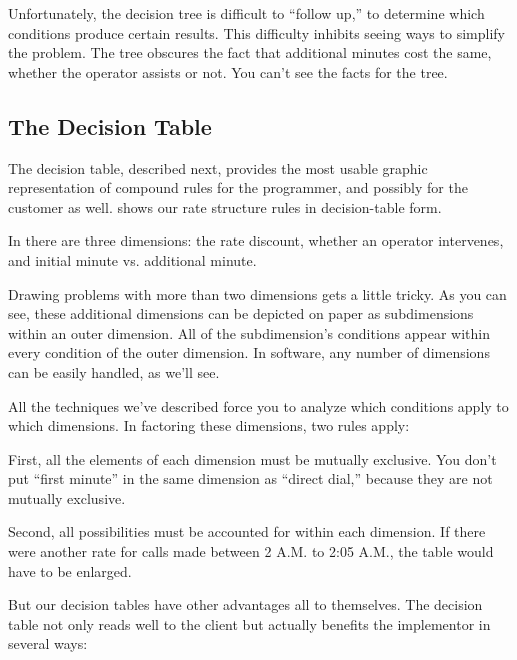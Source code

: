 
Unfortunately, the decision tree is difficult to ``follow up,'' to
determine which conditions produce certain results. This difficulty inhibits
seeing ways to simplify the problem. The tree obscures the fact that
additional minutes cost the same, whether the operator assists or not. You
can't see the facts for the tree.



\subsection{The Decision Table}

\noindent The decision table, described next, provides the most usable graphic
representation of compound rules for the programmer, and possibly for
the customer as well.  shows our rate structure rules in
decision-table form.


In  there are three dimensions: the rate discount, whether
an operator intervenes, and initial minute vs. additional minute.

Drawing problems with more than two dimensions gets a little
tricky. As you can see, these additional dimensions can be depicted on
paper as subdimensions within an outer dimension. All of the
subdimension's conditions appear within every condition of the outer dimension.
In software, any number of dimensions can be easily handled, as we'll see.

All the techniques we've described force you to analyze which
conditions apply to which dimensions. In factoring these dimensions, two rules
apply:

First, all the elements of each dimension must be mutually
exclusive. You don't put ``first minute'' in the same dimension as ``direct dial,''
because they are not mutually exclusive.

Second, all possibilities must be accounted for within each
dimension. If there were another rate for calls made between 2 A.M. to 2:05 A.M.,
the table would have to be enlarged.

But our decision tables have other advantages all to themselves.
The decision table not only reads well to the client but actually benefits
the implementor in several ways:

